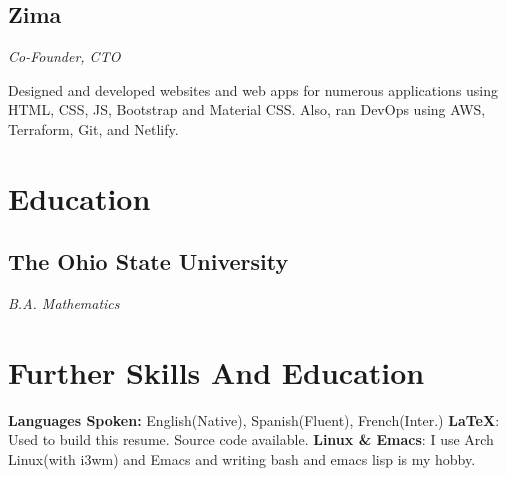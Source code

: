 \documentclass[letterpaper,11pt]{article}
\begin{document}
\subsection{Zima}
\textit{Co-Founder, CTO}
\vspace{2mm}
\begin{adjustwidth}{1cm}{1cm}
Designed and developed websites and web
apps for numerous applications using
HTML, CSS, JS, Bootstrap and Material CSS.
Also, ran DevOps using AWS, Terraform,
Git, and Netlify.
\end{adjustwidth}
\section{Education}
\subsection{The Ohio State University}
\textit{B.A. Mathematics}

\section{Further Skills And Education}
\textbf{Languages Spoken: } English(Native), Spanish(Fluent), French(Inter.)
\newline
\textbf{\LaTeX}: Used to build this resume. Source code available.
\newline
\textbf{Linux \& Emacs}: I use Arch Linux(with i3wm) and Emacs and writing bash and emacs lisp is my hobby.
\newline
\end{document}
